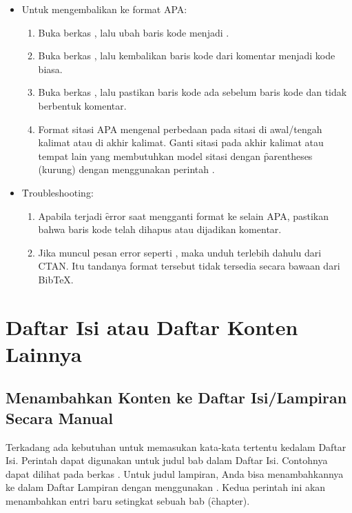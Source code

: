 \begin{itemize}
\begin{enumerate}
	\end{enumerate}
	\item Untuk mengembalikan ke format APA:
	\begin{enumerate}
		\item Buka berkas , lalu ubah baris kode  menjadi .
		\item Buka berkas , lalu kembalikan baris kode  dari komentar menjadi kode biasa.
		\item Buka berkas , lalu pastikan baris kode  ada sebelum baris kode  dan tidak berbentuk komentar.
		\item Format sitasi APA mengenal perbedaan pada sitasi di awal/tengah kalimat atau di akhir kalimat. Ganti sitasi pada akhir kalimat atau tempat lain yang membutuhkan model sitasi dengan \f{parentheses} (kurung) dengan menggunakan perintah .
	\end{enumerate}
	\item \f{Troubleshooting}:
	\begin{enumerate}
		\item Apabila terjadi \f{error} saat mengganti format ke selain APA, pastikan bahwa baris kode  telah dihapus atau dijadikan komentar.
		\item Jika muncul pesan error seperti , maka unduh terlebih dahulu dari CTAN. Itu tandanya format tersebut tidak tersedia secara bawaan dari BibTeX.
	\end{enumerate}
\end{itemize}


\section{Daftar Isi atau Daftar Konten Lainnya}
\label{sec:tableOfContent}


\subsection{Menambahkan Konten ke Daftar Isi/Lampiran Secara Manual}
\label{sec:addTocEntry}
Terkadang ada kebutuhan untuk memasukan kata-kata tertentu kedalam Daftar Isi. Perintah  dapat digunakan untuk judul bab dalam Daftar Isi. Contohnya dapat dilihat pada berkas . Untuk judul lampiran, Anda bisa menambahkannya ke dalam Daftar Lampiran dengan menggunakan . Kedua perintah ini akan menambahkan entri baru setingkat sebuah bab (\f{chapter}).


